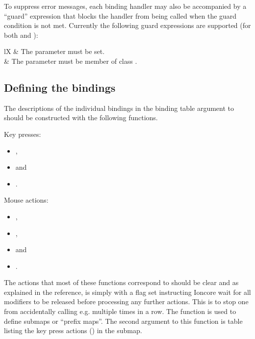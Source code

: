 To suppress error messages, each binding handler may also be accompanied
by a ``guard'' expression that blocks the handler from being called when
the guard condition is not met. Currently the following guard expressions
are supported (for both  and ):

\begin{tabularx}{\linewidth}{lX}
     & The  parameter must be set. \\
     & The  parameter must be member
      of class . \\
\end{tabularx}


\subsection{Defining the bindings}
\label{sec:binddef}

The descriptions of the individual bindings in the binding table argument
to  should be constructed with the following
functions.

Key presses:
\begin{itemize}
    \item {},
    \item {} and
    \item {}.
\end{itemize}
Mouse actions:
\begin{itemize}
    \item {},
    \item {}, 
    \item {} and
    \item {}.
\end{itemize}

The actions that most of these functions correspond to should be clear
and as explained in the reference,  is simply
 with a flag set instructing Ioncore wait for all
modifiers to be released before processing any further actions.
This is to stop one from accidentally calling e.g.
 multiple times in a row. The 
function is used to define submaps or ``prefix maps''. The second
argument to this function is table listing the key press actions
() in the submap.

